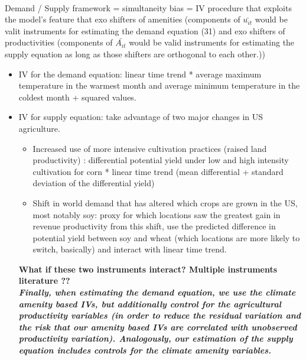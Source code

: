 \documentclass[10pt, final]{article}
\begin{document}
\\
Demand / Supply framework = simultaneity bias = IV procedure that exploits the model's feature that exo shifters of amenities (components of $\bar{u_{it}}$ would be valit instruments for estimating the demand equation (31) and exo shifters of productivities (components of $\bar{A_{it}}$ would be valid instruments for estimating the supply equation as long as those shifters are orthogonal to each other.))
\\
\begin{itemize}
    \item IV for the demand equation: linear time trend * average maximum temperature in the warmest month and average minimum temperature in the coldest month + squared values.
    \item IV for supply equation: take advantage of two major changes in US agriculture. 
    \begin{itemize}
        \item Increased use of more intensive cultivation practices (raised land productivity) : differential potential yield under low and high intensity cultivation for corn * linear time trend (mean differential + standard deviation of the differential yield)
        \item Shift in world demand that has altered which crops are grown in the US, most notably soy: proxy for which locations saw the greatest gain in revenue productivity from this shift, use the predicted difference in potential yield between soy and wheat (which locations are more likely to switch, basically) and interact with linear time trend.
    \end{itemize}
    \textbf{What if these two instruments interact? Multiple instruments literature ??}
    \\
    \textbf{\textit{Finally, when estimating the demand equation, we use the climate amenity based IVs, but additionally control for the agricultural productivity variables (in order to reduce the residual variation and the risk that our amenity based IVs are correlated with unobserved productivity variation). Analogously, our estimation of the supply equation includes controls for the climate amenity variables.}}
\end{itemize}
\end{document}
